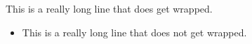 \documentclass{article}
\begin{document}
This is a really long line that does
get wrapped.
\begin{itemize}
	\item
	      This is a really long line
	      that does not get wrapped.
\end{itemize}
\end{document}
